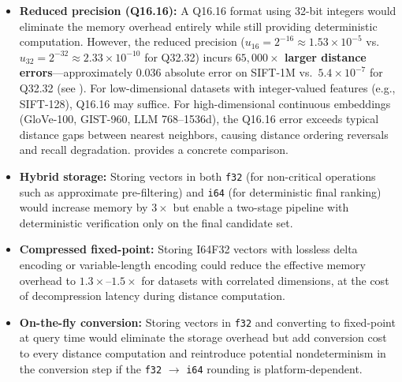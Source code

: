\documentclass[10pt,journal]{IEEEtran}
\begin{document}
\begin{itemize}[leftmargin=*]
  \item \textbf{Reduced precision (Q16.16):} A Q16.16 format using 32-bit integers would eliminate the memory overhead entirely while still providing deterministic computation. However, the reduced precision ($u_{16} = 2^{-16} \approx 1.53 \times 10^{-5}$ vs.\ $u_{32} = 2^{-32} \approx 2.33 \times 10^{-10}$ for Q32.32) incurs \textbf{$65{,}000\times$ larger distance errors}---approximately $0.036$ absolute error on SIFT-1M vs.\ $5.4 \times 10^{-7}$ for Q32.32 (see ). For low-dimensional datasets with integer-valued features (e.g., SIFT-128), Q16.16 may suffice. For high-dimensional continuous embeddings (GloVe-100, GIST-960, LLM 768--1536d), the Q16.16 error exceeds typical distance gaps between nearest neighbors, causing distance ordering reversals and recall degradation.  provides a concrete comparison.

  \item \textbf{Hybrid storage:} Storing vectors in both \texttt{f32} (for non-critical operations such as approximate pre-filtering) and \texttt{i64} (for deterministic final ranking) would increase memory by $3\times$ but enable a two-stage pipeline with deterministic verification only on the final candidate set.

  \item \textbf{Compressed fixed-point:} Storing I64F32 vectors with lossless delta encoding or variable-length encoding could reduce the effective memory overhead to $1.3\times$--$1.5\times$ for datasets with correlated dimensions, at the cost of decompression latency during distance computation.

  \item \textbf{On-the-fly conversion:} Storing vectors in \texttt{f32} and converting to fixed-point at query time would eliminate the storage overhead but add conversion cost to every distance computation and reintroduce potential nondeterminism in the conversion step if the \texttt{f32} $\rightarrow$ \texttt{i64} rounding is platform-dependent.
\end{itemize}
\end{document}
